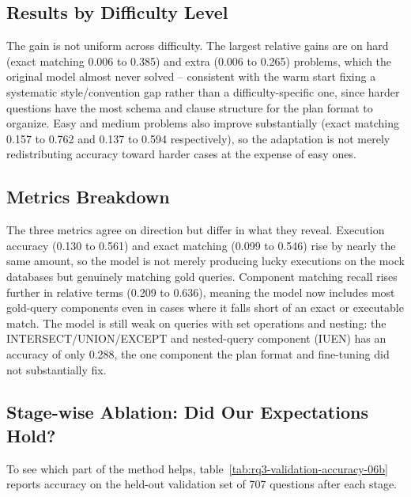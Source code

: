 \subsection{Results by Difficulty Level}
\label{sec:rq3-results-difficulty}

The gain is not uniform across difficulty. The largest relative gains are on hard (exact matching 0.006 to 0.385) and extra (0.006 to 0.265) problems, which the original model almost never solved -- consistent with the warm start fixing a systematic style/convention gap rather than a difficulty-specific one, since harder questions have the most schema and clause structure for the plan format to organize. Easy and medium problems also improve substantially (exact matching 0.157 to 0.762 and 0.137 to 0.594 respectively), so the adaptation is not merely redistributing accuracy toward harder cases at the expense of easy ones.

\subsection{Metrics Breakdown}
\label{sec:rq3-metrics-breakdown}

The three metrics agree on direction but differ in what they reveal. Execution accuracy (0.130 to 0.561) and exact matching (0.099 to 0.546) rise by nearly the same amount, so the model is not merely producing lucky executions on the mock databases but genuinely matching gold queries. Component matching recall rises further in relative terms (0.209 to 0.636), meaning the model now includes most gold-query components even in cases where it falls short of an exact or executable match. The model is still weak on queries with set operations and nesting: the INTERSECT/UNION/EXCEPT and nested-query component (IUEN) has an accuracy of only 0.288, the one component the plan format and fine-tuning did not substantially fix.

\subsection{Stage-wise Ablation: Did Our Expectations Hold?}
\label{sec:rq3-ablation}

To see which part of the method helps, table~\ref{tab:rq3-validation-accuracy-06b} reports accuracy on the held-out validation set of 707 questions after each stage.


